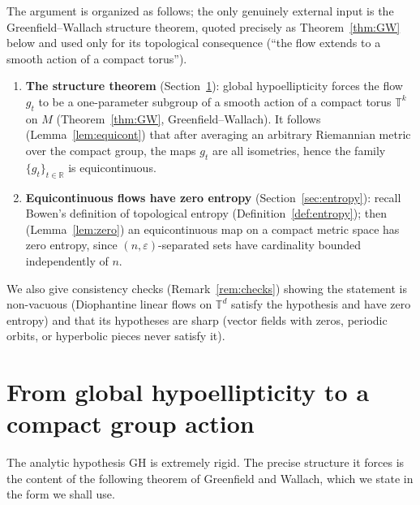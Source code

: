 \documentclass[11pt]{article}
\theoremstyle{definition}
\newcommand{\TT}{\mathbb{T}}
\newcommand{\RR}{\mathbb{R}}
\begin{document}
The argument is organized as follows; the only genuinely external input is
the Greenfield--Wallach structure theorem, quoted precisely as
Theorem~\ref{thm:GW} below and used only for its topological consequence
(``the flow extends to a smooth action of a compact torus'').
\begin{enumerate}[label=(\arabic*), leftmargin=2.5em]
  \item \textbf{The structure theorem} (Section~\ref{sec:GHtostruct}):
        global hypoellipticity forces the flow $g_t$ to be a
        one-parameter subgroup of a smooth action of a compact torus
        $\TT^k$ on $M$ (Theorem~\ref{thm:GW}, Greenfield--Wallach).
        It follows (Lemma~\ref{lem:equicont}) that after averaging an
        arbitrary Riemannian metric over the compact group, the maps
        $g_t$ are all isometries, hence the family
        $\{g_t\}_{t \in \RR}$ is equicontinuous.
  \item \textbf{Equicontinuous flows have zero entropy}
        (Section~\ref{sec:entropy}): recall Bowen's definition of
        topological entropy (Definition~\ref{def:entropy}); then
        (Lemma~\ref{lem:zero}) an equicontinuous map on a compact metric
        space has zero entropy, since $(n,\varepsilon)$-separated sets
        have cardinality bounded independently of $n$.
\end{enumerate}
We also give consistency checks (Remark~\ref{rem:checks}) showing the
statement is non-vacuous (Diophantine linear flows on $\TT^d$ satisfy the
hypothesis and have zero entropy) and that its hypotheses are sharp
(vector fields with zeros, periodic orbits, or hyperbolic pieces never
satisfy it).

\section{From global hypoellipticity to a compact group action}
\label{sec:GHtostruct}

The analytic hypothesis GH is extremely rigid. The precise structure it
forces is the content of the following theorem of Greenfield and Wallach,
which we state in the form we shall use.
\end{document}
